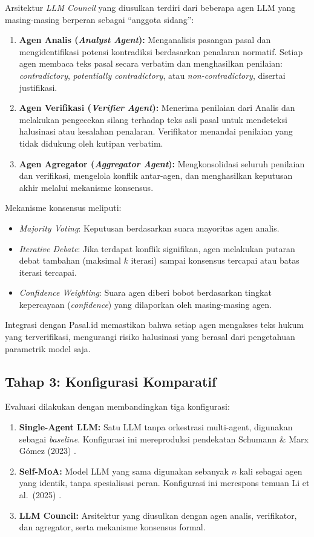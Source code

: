 Arsitektur \textit{LLM Council} yang diusulkan terdiri dari beberapa agen LLM yang masing-masing berperan sebagai ``anggota sidang'':

\begin{enumerate}
	\item \textbf{Agen Analis (\textit{Analyst Agent}):} Menganalisis pasangan pasal dan mengidentifikasi potensi kontradiksi berdasarkan penalaran normatif. Setiap agen membaca teks pasal secara verbatim dan menghasilkan penilaian: \textit{contradictory}, \textit{potentially contradictory}, atau \textit{non-contradictory}, disertai justifikasi.
	\item \textbf{Agen Verifikasi (\textit{Verifier Agent}):} Menerima penilaian dari Analis dan melakukan pengecekan silang terhadap teks asli pasal untuk mendeteksi halusinasi atau kesalahan penalaran. Verifikator menandai penilaian yang tidak didukung oleh kutipan verbatim.
	\item \textbf{Agen Agregator (\textit{Aggregator Agent}):} Mengkonsolidasi seluruh penilaian dan verifikasi, mengelola konflik antar-agen, dan menghasilkan keputusan akhir melalui mekanisme konsensus.
\end{enumerate}

Mekanisme konsensus meliputi:
\begin{itemize}
	\item \textit{Majority Voting}: Keputusan berdasarkan suara mayoritas agen analis.
	\item \textit{Iterative Debate}: Jika terdapat konflik signifikan, agen melakukan putaran debat tambahan (maksimal $k$ iterasi) sampai konsensus tercapai atau batas iterasi tercapai.
	\item \textit{Confidence Weighting}: Suara agen diberi bobot berdasarkan tingkat kepercayaan (\textit{confidence}) yang dilaporkan oleh masing-masing agen.
\end{itemize}

Integrasi dengan Pasal.id memastikan bahwa setiap agen mengakses teks hukum yang terverifikasi, mengurangi risiko halusinasi yang berasal dari pengetahuan parametrik model saja.

\subsection{Tahap 3: Konfigurasi Komparatif}

Evaluasi dilakukan dengan membandingkan tiga konfigurasi:
\begin{enumerate}
	\item \textbf{Single-Agent LLM:} Satu LLM tanpa orkestrasi multi-agent, digunakan sebagai \textit{baseline}. Konfigurasi ini mereproduksi pendekatan Schumann \& Marx Gómez (2023) \cite{schumann2023}.
	\item \textbf{Self-MoA:} Model LLM yang sama digunakan sebanyak $n$ kali sebagai agen yang identik, tanpa spesialisasi peran. Konfigurasi ini merespons temuan Li et al.\ (2025) \cite{lismoa2025}.
	\item \textbf{LLM Council:} Arsitektur yang diusulkan dengan agen analis, verifikator, dan agregator, serta mekanisme konsensus formal.
\end{enumerate}

